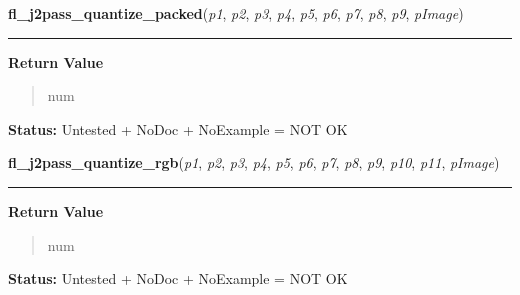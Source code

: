     \label{xformslib:library:fl_j2pass_quantize_packed}

    \vspace{0.5ex}

\hspace{.8\funcindent}\begin{boxedminipage}{\funcwidth}

    \raggedright \textbf{fl\_j2pass\_quantize\_packed}(\textit{p1}, \textit{p2}, \textit{p3}, \textit{p4}, \textit{p5}, \textit{p6}, \textit{p7}, \textit{p8}, \textit{p9}, \textit{pImage})

    \vspace{-1.5ex}

    \rule{\textwidth}{0.5\fboxrule}
\setlength{\parskip}{2ex}
\setlength{\parskip}{1ex}
      \textbf{Return Value}
    \vspace{-1ex}

      \begin{quote}
      num

      \end{quote}

\textbf{Status:} Untested + NoDoc + NoExample = NOT OK



    \end{boxedminipage}

    \label{xformslib:library:fl_j2pass_quantize_rgb}

    \vspace{0.5ex}

\hspace{.8\funcindent}\begin{boxedminipage}{\funcwidth}

    \raggedright \textbf{fl\_j2pass\_quantize\_rgb}(\textit{p1}, \textit{p2}, \textit{p3}, \textit{p4}, \textit{p5}, \textit{p6}, \textit{p7}, \textit{p8}, \textit{p9}, \textit{p10}, \textit{p11}, \textit{pImage})

    \vspace{-1.5ex}

    \rule{\textwidth}{0.5\fboxrule}
\setlength{\parskip}{2ex}
\setlength{\parskip}{1ex}
      \textbf{Return Value}
    \vspace{-1ex}

      \begin{quote}
      num

      \end{quote}

\textbf{Status:} Untested + NoDoc + NoExample = NOT OK



    \end{boxedminipage}

